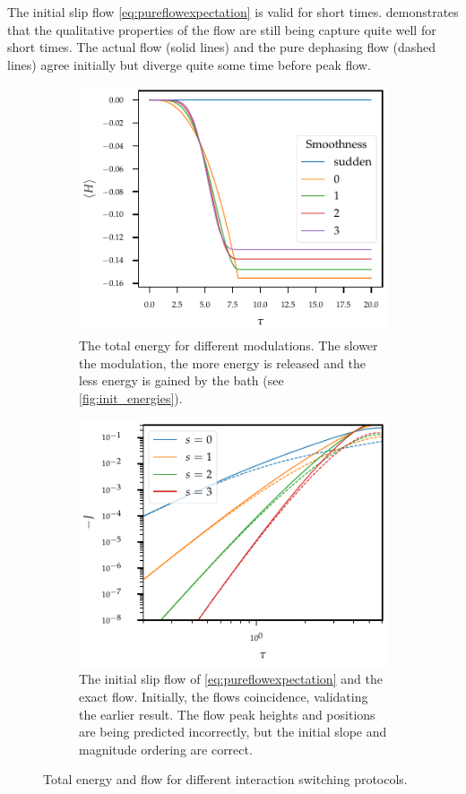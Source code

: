 The initial slip flow \cref{eq:pureflowexpectation} is valid for short
times.   demonstrates that the qualitative
properties of the flow are still being capture quite well for short
times. The actual flow (solid lines) and the pure dephasing flow
(dashed lines) agree initially but diverge quite some time before peak
flow.
\begin{figure}[htp]
  \centering
  \begin{subfigure}[t]{0.49\linewidth}
    \centering\captionsetup{width=.8\linewidth}
    \includegraphics{figs/one_bath_mod/total_init}
    \caption{\label{fig:init_total}The total energy for different
      modulations. The slower the modulation, the more energy is
      released and the less energy is gained by the bath (see
      \cref{fig:init_energies}).}
  \end{subfigure}%
  \begin{subfigure}[t]{0.49\linewidth}
    \centering\captionsetup{width=.8\linewidth}
    \includegraphics{figs/one_bath_mod/initial_slip_modcoup}
    \caption{\label{fig:init_slip_mod} The initial slip flow of
      \cref{eq:pureflowexpectation} and the exact flow. Initially, the
      flows coincidence, validating the earlier result. The flow peak
      heights and positions are being predicted incorrectly, but the
      initial slope and magnitude ordering are correct.}
  \end{subfigure}
  \caption{Total energy and flow for different interaction switching
    protocols.}
\end{figure}


